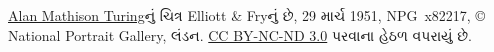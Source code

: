 \href{http://www.npg.org.uk/collections/search/portrait/mw63680/Alan-Mathison-Turing?}{Alan
Mathison Turing}નું ચિત્ર Elliott \& Fryનું છે, 29 માર્ચ 1951, NPG~x82217,
\copyright{} National Portrait Gallery, લંડન.
\href{http://creativecommons.org/licenses/by-nc-nd/3.0/}{CC BY-NC-ND 3.0}
પરવાના હેઠળ વપરાયું છે.
